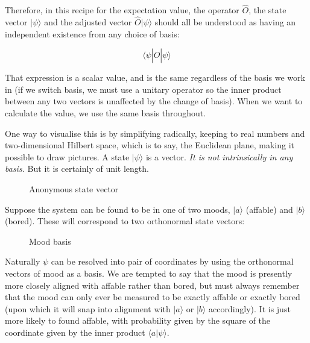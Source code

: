 Therefore, in this recipe for the expectation value, the operator $\hat{O}$, the state vector $| \psi \rangle$ and the adjusted vector $\hat{O} | \psi \rangle$ should all be understood as having an independent existence from any choice of basis:

$$
\langle \psi| \hat{O} | \psi \rangle
$$

That expression is a scalar value, and is the same regardless of the basis we work in (if we switch basis, we must use a unitary operator so the inner product between any two vectors is unaffected by the change of basis). When we want to calculate the value, we use the same basis throughout.

One way to visualise this is by simplifying radically, keeping to real numbers and two-dimensional Hilbert space, which is to say, the Euclidean plane, making it possible to draw pictures. A state $|\psi\rangle$ is a vector. \textit{It is not intrinsically in any basis.} But it is certainly of unit length.

\begin{figure}[h]
  \centering
  \centering
  \caption{Anonymous state vector} \label{fig:state-vector}
\end{figure}

Suppose the system can be found to be in one of two moods, $|a\rangle$ (affable) and $|b\rangle$ (bored). These will correspond to two orthonormal state vectors:

\begin{figure}[h]
  \centering
  \centering
  \caption{Mood basis} \label{fig:mood-basis}
\end{figure}

Naturally $\psi$ can be resolved into pair of coordinates by using the orthonormal vectors of mood as a basis. We are tempted to say that the mood is presently more closely aligned with affable rather than bored, but must always remember that the mood can only ever be measured to be exactly affable or exactly bored (upon which it will snap into alignment with $|a\rangle$ or $|b\rangle$ accordingly). It is just more likely to found affable, with probability given by the square of the coordinate given by the inner product $\langle a|\psi \rangle$.


